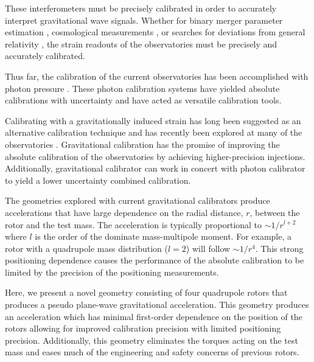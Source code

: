 \documentclass[superscriptaddress, twocolumn, prd]{revtex4-1}
\begin{document}
These interferometers must be precisely calibrated in order to accurately interpret gravitational wave signals. Whether for binary merger parameter estimation \cite{abbott2020population}, cosmological measurements \cite{abbott2021gravitational, ligo2017gravitational}, or searches for deviations from general relativity \cite{abbott2020tests}, the strain readouts of the observatories must be precisely and accurately calibrated.

Thus far, the calibration of the current observatories has been accomplished with photon pressure \cite{PCal}. These photon calibration systems have yielded absolute calibrations with  uncertainty and have acted as versatile calibration tools. 

Calibrating with a gravitationally induced strain has long been suggested as an alternative calibration technique \cite{hirakawa1980dynamical, kuroda1985experimental, mio1987experimental, astone1991evaluation, astone1998experimental, Matone_2007} and has recently been explored at many of the observatories \cite{Estevez_2018, estevez2021newtonian, PhysRevD.98.022005, ncal}. Gravitational calibration has the promise of improving the absolute calibration of the observatories by achieving higher-precision injections. Additionally, gravitational calibrator can work in concert with photon calibrator to yield a lower uncertainty combined calibration.

The geometries explored with current gravitational calibrators \cite{Estevez_2018, estevez2021newtonian, PhysRevD.98.022005, ncal} produce accelerations that have large dependence on the radial distance, $r$, between the rotor and the test mass. The acceleration is typically proportional to $\sim1/r^{l+2}$ where $l$ is the order of the dominate mass-multipole moment. For example, a rotor with a quadrupole mass distribution ($l=2$) will follow $\sim1/r^4$. This strong positioning dependence causes the performance of the absolute calibration to be limited by the precision of the positioning measurements. 

Here, we present a novel geometry consisting of four quadrupole rotors that produces a pseudo plane-wave gravitational acceleration. This geometry produces an acceleration which has minimal first-order dependence on the position of the rotors allowing for improved calibration precision with limited positioning precision. Additionally, this geometry eliminates the torques acting on the test mass and eases much of the engineering and safety concerns of previous rotors.
\end{document}
